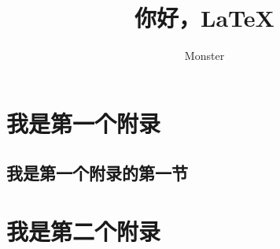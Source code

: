 \documentclass[cs4size,a4paper,fancyhdr,fntef,oneside,openany]{ctexbook}
\title{你好，\LaTeX}
\author{Monster}
\begin{document}
\maketitle
\frontmatter
\tableofcontents
\mainmatter

\backmatter
\appendix
\chapter{我是第一个附录}
\section{我是第一个附录的第一节}
\chapter{我是第二个附录}
\end{document}
